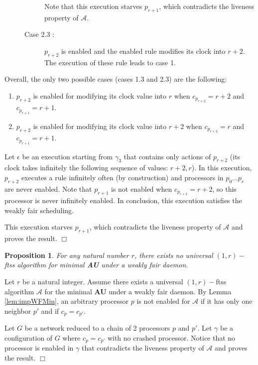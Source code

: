 \documentclass[11pt,english,letterpaper]{article}
\newtheorem{proposition}{Proposition}
\newenvironment{proof}{{\noindent\bf Proof. } }{{\hfill $\Box$}}
\begin{document}
\begin{proof}
\begin{description}
\begin{description}
Note that this execution starves $p_{r+1}$, which contradicts the liveness property of $\mathcal{A}$. 
\item[Case 2.3 :] $p_{r+2}$ is enabled and the enabled rule modifies its clock into $r+2$.\\
The execution of these rule leads to case 1.

\end{description}
\end{description}

Overall, the only two possible cases (cases 1.3 and 2.3) are the following: 

\begin{enumerate} 
\item $p_{r+2}$ is enabled for modifying its clock value into $r$ when $c_{p_{r+2}}=r+2$ and $c_{p_{r+1}}=r+1$.
\item  $p_{r+2}$ is enabled for modifying its clock value into $r+2$  when $c_{p_{r+2}}=r$ and $c_{p_{r+1}}=r+1$. 
\end{enumerate}

Let $\epsilon$ be an execution starting from $\gamma_{3}$ that contains only actions of $p_{r+2}$ (its clock takes infinitely the following sequence of values: $r+2,r$). In this execution, $p_{r+2}$ executes a rule infinitely often (by construction) and processors in $p_{0} \ldots p_{r}$ are never enabled. Note that $p_{r+1}$ is not enabled when $c_{p_{r+2}}=r+2$, so this processor is never infinitely enabled. In conclusion, this execution satisfies the weakly fair scheduling. 

This execution starves $p_{r+1}$, which contradicts the liveness property of $\mathcal{A}$ and proves the result.
\end{proof}

\begin{proposition}\label{prop:impWFMin}
For any natural number $r$, there exists no universal $(1,r)-$ftss algorithm for \emph{minimal} \textbf{AU} under a weakly fair daemon.
\end{proposition}

\begin{proof}
Let $r$ be a natural integer. Assume there exists a universal $(1,r)-$ftss algorithm $\mathcal{A}$ for the minimal \textbf{AU} under a weakly fair daemon. By Lemma \ref{lem:impWFMin}, an arbitrary processor $p$ is not enabled for $\mathcal{A}$ if it has only one neighbor $p'$ and if $c_{p}=c_{p'}$.

Let $G$ be a network reduced to a chain of 2 processors $p$ and $p'$. Let $\gamma$ be a configuration of $G$ where $c_{p}=c_{p'}$ with no crashed processor. Notice that no processor is enabled in $\gamma$ that contradicts the liveness property of $\mathcal{A}$ and proves the result.
\end{proof}
\end{document}
